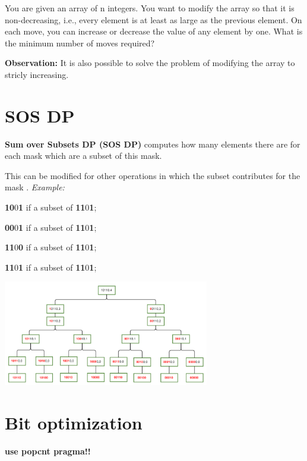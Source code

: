     You are given an array of n integers. You want to modify the array so that it is non-decreasing, i.e., every element is at least as large as the previous element.
    On each move, you can increase or decrease the value of any element by one. What is the minimum number of moves required?
    
    \textbf{Observation: } It is also possible to solve the problem of modifying the array to stricly increasing.


\section{SOS DP}

    \textbf{Sum over Subsets DP (SOS DP)} computes how many elements there are for each mask
    which are a subset of this mask.

    This can be modified for other operations in which the subset contributes for the mask
    .
    \textit{Example:}

    \textbf{10}0\textbf{1} if a subset of \textbf{11}0\textbf{1};

    \textbf{00}0\textbf{1} if a subset of \textbf{11}0\textbf{1};
    
    \textbf{11}0\textbf{0} if a subset of \textbf{11}0\textbf{1};
    
    \textbf{11}0\textbf{1} if a subset of \textbf{11}0\textbf{1};

    \begin{center}
        \includegraphics[width=9cm]{content/dynamic-programming/sos-example.pdf}
    \end{center}


\section{Bit optimization}

    \textbf{use popcnt pragma!!}

